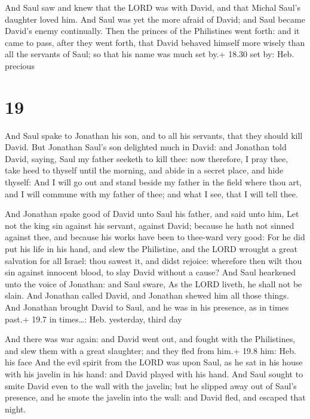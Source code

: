  And Saul saw and knew that the LORD was with David, and
that Michal Saul's daughter loved him.  And Saul was yet
the more afraid of David; and Saul became David's enemy continually.
 Then the princes of the Philistines went forth: and it
came to pass, after they went forth, that David behaved himself more
wisely than all the servants of Saul; so that his name was much set by.+
18.30 set by: Heb. precious

\hypertarget{section-18}{%
\section{19}\label{section-18}}

 And Saul spake to Jonathan his son, and to all his
servants, that they should kill David.  But Jonathan Saul's
son delighted much in David: and Jonathan told David, saying, Saul my
father seeketh to kill thee: now therefore, I pray thee, take heed to
thyself until the morning, and abide in a secret place, and hide
thyself:  And I will go out and stand beside my father in
the field where thou art, and I will commune with my father of thee; and
what I see, that I will tell thee.

 And Jonathan spake good of David unto Saul his father,
and said unto him, Let not the king sin against his servant, against
David; because he hath not sinned against thee, and because his works
have been to thee-ward very good:  For he did put his life
in his hand, and slew the Philistine, and the LORD wrought a great
salvation for all Israel: thou sawest it, and didst rejoice: wherefore
then wilt thou sin against innocent blood, to slay David without a
cause?  And Saul hearkened unto the voice of Jonathan: and
Saul sware, As the LORD liveth, he shall not be slain.  And
Jonathan called David, and Jonathan shewed him all those things. And
Jonathan brought David to Saul, and he was in his presence, as in times
past.+ 19.7 in times\ldots: Heb. yesterday, third day

 And there was war again: and David went out, and fought
with the Philistines, and slew them with a great slaughter; and they
fled from him.+ 19.8 him: Heb. his face  And the evil spirit
from the LORD was upon Saul, as he sat in his house with his javelin in
his hand: and David played with his hand.  And Saul sought
to smite David even to the wall with the javelin; but he slipped away
out of Saul's presence, and he smote the javelin into the wall: and
David fled, and escaped that night.

